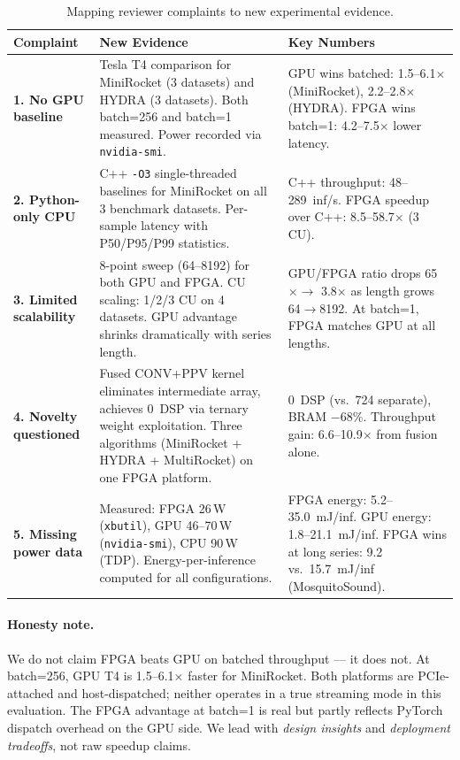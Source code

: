 \documentclass[11pt]{article}
\newcommand{\infs}{inf/s}
\begin{document}
\begin{table}[H]
\centering
\caption{Mapping reviewer complaints to new experimental evidence.}
\label{tab:complaints}
\small
\begin{tabularx}{\textwidth}{p{} p{} p{}}
\toprule
\textbf{Complaint} & \textbf{New Evidence} & \textbf{Key Numbers} \\
\midrule

\textbf{1. No GPU baseline} &
Tesla T4 comparison for MiniRocket (3 datasets) and HYDRA (3 datasets).
Both batch=256 and batch=1 measured.
Power recorded via \texttt{nvidia-smi}. &
GPU wins batched: 1.5--6.1$\times$ (MiniRocket), 2.2--2.8$\times$ (HYDRA).
FPGA wins batch=1: 4.2--7.5$\times$ lower latency. \\
\addlinespace

\textbf{2. Python-only CPU} &
C++ \texttt{-O3} single-threaded baselines for MiniRocket on all 3 benchmark datasets.
Per-sample latency with P50/P95/P99 statistics. &
C++ throughput: 48--289~\infs{}.
FPGA speedup over C++: 8.5--58.7$\times$ (3\,CU). \\
\addlinespace

\textbf{3. Limited scalability} &
8-point sweep (64--8192) for both GPU and FPGA.
CU scaling: 1/2/3 CU on 4 datasets.
GPU advantage shrinks dramatically with series length. &
GPU/FPGA ratio drops 65$\times \rightarrow$ 3.8$\times$ as length grows 64$\rightarrow$8192.
At batch=1, FPGA matches GPU at all lengths. \\
\addlinespace

\textbf{4. Novelty questioned} &
Fused CONV+PPV kernel eliminates intermediate array, achieves 0~DSP via ternary weight exploitation.
Three algorithms (MiniRocket + HYDRA + MultiRocket) on one FPGA platform. &
0~DSP (vs.\ 724 separate), BRAM $-68\%$.
Throughput gain: 6.6--10.9$\times$ from fusion alone. \\
\addlinespace

\textbf{5. Missing power data} &
Measured: FPGA 26\,W (\texttt{xbutil}), GPU 46--70\,W (\texttt{nvidia-smi}), CPU 90\,W (TDP).
Energy-per-inference computed for all configurations. &
FPGA energy: 5.2--35.0~mJ/inf.
GPU energy: 1.8--21.1~mJ/inf.
FPGA wins at long series: 9.2 vs.\ 15.7~mJ/inf (MosquitoSound). \\

\bottomrule
\end{tabularx}
\end{table}

\paragraph{Honesty note.}
We do not claim FPGA beats GPU on batched throughput --- it does not.
At batch=256, GPU T4 is 1.5--6.1$\times$ faster for MiniRocket.
Both platforms are PCIe-attached and host-dispatched; neither operates in a true streaming mode in this evaluation.
The FPGA advantage at batch=1 is real but partly reflects PyTorch dispatch overhead on the GPU side.
We lead with \emph{design insights} and \emph{deployment tradeoffs}, not raw speedup claims.
\end{document}

